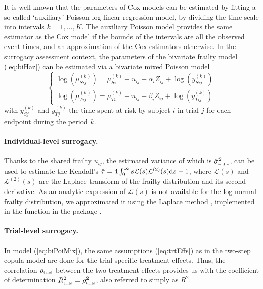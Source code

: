 \documentclass[article,shortnames, nojss]{jss}\usepackage[]{graphicx}\usepackage[]{color}
\begin{document}
It is well-known \cite[see for instance][]{Whitehead80, crowtherEtal12}
  that the parameters of Cox models can be estimated by fitting
  a so-called `auxiliary' Poisson log-linear regression model,
  by dividing the time scale into intervals $k=1, \ldots, K$.
The auxiliary Poisson model provides the same estimator as the Cox model
  if the bounds of the intervals are all the observed event times,
  and an approximation of the Cox estimators otherwise.
In the surrogacy assessment context,
  the parameters of the bivariate frailty model (\ref{eq:biHaz})
  can be estimated via a bivariate mixed Poisson model
  \begin{equation}
    \begin{cases}
      \log\left( \mu_{S ij}^{(k)} \right) = 
        \mu_{S i}^{(k)}  + u_{ij}
        + \alpha_i Z_{ij}
        + \log\left(y_{S ij}^{(k)} \right)\\
      \log\left( \mu_{T ij}^{(k)} \right) = 
        \mu_{T i}^{(k)}  + u_{ij}
        + \beta_i Z_{ij}
        + \log\left(y_{T ij}^{(k)} \right)
    \end{cases}
    \label{eq:biPoiMix}
  \end{equation}
  with $y_{Sj}^{(k)}$ and $y_{Tj}^{(k)}$ the time spent at risk
  by subject $i$ in trial $j$ for each endpoint
  during the period $k$.


\paragraph{Individual-level surrogacy.}
Thanks to the shared frailty $u_{ij}$,
  the estimated variance of which  is $\hat\sigma^2_\text{\tiny indiv}$,
  can be used to estimate the Kendall's
$\hat\tau = 4 \int_0^\infty s \mathcal L(s)\mathcal L^{(2)}(s) \textrm d s - 1$,
where $\mathcal L(s)$ and $\mathcal L^{(2)}(s)$
are the Laplace transform of the frailty distribution and its
second derivative.
As an analytic expression of $\mathcal L(s)$
is not available for the log-normal frailty distribution,
we approximated it using the Laplace method \citep{GoutisCasella99},
implemented in the  function
in the  package \citep{parfmJSS, R:parfm}.


\paragraph{Trial-level surrogacy.} \label{sec:trialDep}
In model (\ref{eq:biPoiMix}),
  the same assumptions (\ref{eq:trtEffs})
  as in the two-step copula model
  are done for the trial-specific treatment effects.
Thus, the correlation $\rho_\text{\tiny trial}$
  between the two treatment effects provides us with 
  the coefficient of determination
  $R^2_\text{\tiny trial} = \rho^2_\text{\tiny trial}$,
  also referred to simply as $R^2$.
\end{document}
